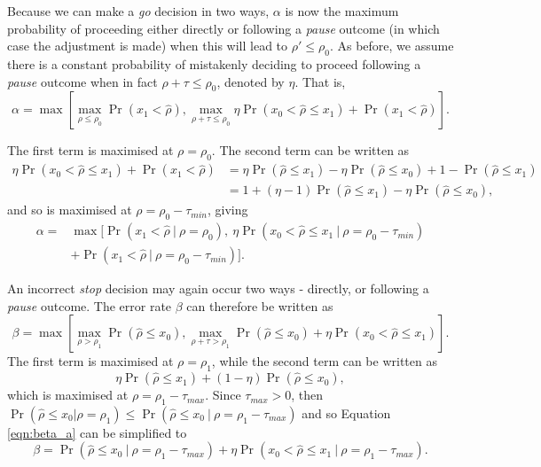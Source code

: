 \documentclass[referee, lineno, pdflatex,sn-vancouver,Numbered]{sn-jnl}%
\theoremstyle{thmstyleone}%
\theoremstyle{thmstyletwo}%
\theoremstyle{thmstylethree}%
\begin{document}
Because we can make a \emph{go} decision in two ways, $\alpha$ is now the maximum probability of proceeding either directly or following a \emph{pause} outcome (in which case the adjustment is made) when this will lead to $\rho' \leq \rho_0$. As before, we assume there is a constant probability of mistakenly deciding to proceed following a \emph{pause} outcome when in fact $\rho + \tau \leq \rho_0$, denoted  by $\eta$. That is,
\begin{equation*}
\alpha = \max \left[ \max_{\rho \leq \rho_0} \Pr(x_1 < \hat{\rho}), \max_{\rho + \tau \leq \rho_0} \eta \Pr(x_0 < \hat{\rho} \leq x_1) + \Pr(x_1 < \hat{\rho}) \right].
\end{equation*}

The first term is maximised at $\rho = \rho_0$. The second term can be written as
\begin{align*}
\eta \Pr(x_0 < \hat{\rho} \leq x_1) + \Pr(x_1 < \hat{\rho}) &=
\eta \Pr(\hat{\rho} \leq x_1) - \eta \Pr(\hat{\rho} \leq x_0) + 1 - \Pr(\hat{\rho} \leq x_1)\\
&= 1 + (\eta - 1)\Pr(\hat{\rho} \leq x_1) - \eta \Pr(\hat{\rho} \leq x_0),
\end{align*}
and so is maximised at $\rho = \rho_0 - \tau_{min}$, giving 
\begin{align}\label{eqn:alpha}
\alpha =& \max \big[ \Pr(x_1 < \hat{\rho} ~|~ \rho = \rho_0), ~\eta \Pr(x_0 < \hat{\rho} \leq x_1 ~|~ \rho = \rho_0 - \tau_{min}) \nonumber \\
&+ \Pr(x_1 < \hat{\rho} ~|~ \rho = \rho_0 - \tau_{min}) \big].
\end{align}

An incorrect \emph{stop} decision may again occur two ways - directly, or following a \emph{pause} outcome. The error rate $\beta$ can therefore be written as
\begin{equation}\label{eqn:beta_a}
\beta = \max \left[ \max_{\rho > \rho_1} \Pr(\hat{\rho} \leq x_0), \max_{\rho + \tau > \rho_1} \Pr(\hat{\rho} \leq x_0) + \eta \Pr(x_0 < \hat{\rho} \leq x_1) \right].
\end{equation}
The first term is maximised at $\rho = \rho_1$, while the second term can be written as
\begin{equation*}
\eta \Pr(\hat{\rho} \leq x_1) + (1 - \eta) \Pr(\hat{\rho} \leq x_0),
\end{equation*}
which is maximised at $\rho = \rho_1 - \tau_{max}$. Since $\tau_{max} > 0$, then $\Pr(\hat{\rho} \leq x_0 | \rho = \rho_1) \leq \Pr(\hat{\rho} \leq x_0 ~|~ \rho = \rho_1  - \tau_{max})$ and so Equation \ref{eqn:beta_a} can be simplified to
\begin{equation}\label{eqn:beta}
\beta = \Pr(\hat{\rho} \leq x_0 ~|~ \rho = \rho_1 - \tau_{max}) + \eta \Pr(x_0 < \hat{\rho} \leq x_1 ~|~ \rho = \rho_1 - \tau_{max}).
\end{equation}
\end{document}

